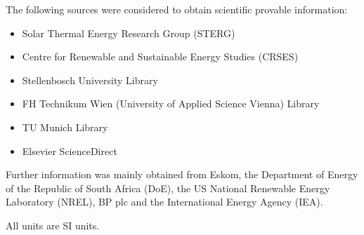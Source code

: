 The following sources were considered to obtain scientific provable information:
\begin{itemize}
\item Solar Thermal Energy Research Group (STERG)
\item Centre for Renewable and Sustainable Energy Studies (CRSES)
\item Stellenbosch University Library
\item FH Technikum Wien (University of Applied Science Vienna) Library
\item TU Munich Library
\item Elsevier ScienceDirect
\end{itemize}


Further information was mainly obtained from Eskom, the Department of Energy of the Republic of South Africa (DoE), the US National Renewable Energy Laboratory (NREL), BP plc and the International Energy Agency (IEA).


All units are SI units.